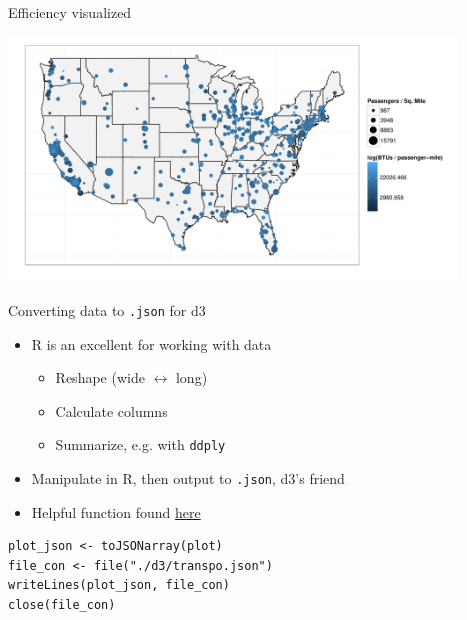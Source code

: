 \documentclass[sans,aspectratio=169,presentation,bigger,fleqn]{beamer}
\begin{document}
\begin{frame}[label=sec-30]{Efficiency visualized}
\begin{center}
\includegraphics[height=6.5cm]{./img/transpo-plot.pdf}
\end{center}

\normalsize
\end{frame}

\begin{frame}[fragile,label=sec-31]{Converting data to \texttt{.json} for d3}
 \begin{itemize}
\item R is an excellent for working with data
\begin{itemize}
\item Reshape (wide \(\leftrightarrow\) long)
\item Calculate columns
\item Summarize, e.g. with \texttt{ddply}
\end{itemize}
\item Manipulate in R, then output to \texttt{.json}, d3's friend
\item Helpful function found \href{http://theweiluo.wordpress.com/2011/09/30/r-to-json-for-d3-js-and-protovis/}{here}
\end{itemize}

\scriptsize
\begin{verbatim}
plot_json <- toJSONarray(plot)
file_con <- file("./d3/transpo.json")
writeLines(plot_json, file_con)
close(file_con)
\end{verbatim}
\normalsize
\end{frame}
\end{document}

